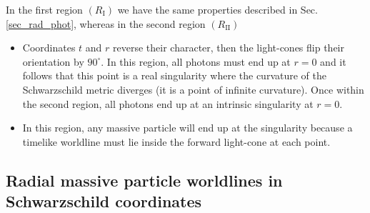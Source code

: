 \documentclass[letterpaper,11pt,onecolumn]{article}
\begin{document}
In the first region $(R_{\mathrm{I}})$ we have the same properties described in Sec.\ref{sec_rad_phot}, whereas in the second region $(R_{\mathrm{II}})$

\begin{itemize}
  \item  Coordinates $t$ and $r$ reverse their character, then the light-cones flip their orientation by $90^{\circ}$. In this region, all photons must end up at $r=0$ and it follows that this point is a real singularity where the curvature of the Schwarzschild metric diverges (it is a point of infinite curvature). Once within the second region, all photons end up at an intrinsic singularity at $r=0$.
  \item In this region, any massive particle will end up at the singularity because a timelike worldline must lie inside the forward light-cone at each point.

\end{itemize}

\subsection{Radial massive particle worldlines in Schwarzschild coordinates}
\end{document}
